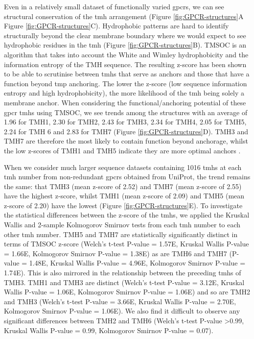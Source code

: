 Even in a relatively small dataset of functionally varied \gls{gpcr}s, we can see structural conservation of the \gls{tmh} arrangement (Figure \ref{fig:GPCR-structures}A Figure \ref{fig:GPCR-structures}C).
Hydrophobic patterns are hard to identify structurally beyond the clear membrane boundary where we would expect to see hydrophobic residues in the \gls{tmh} (Figure \ref{fig:GPCR-structures}B).
TMSOC \cite{Wong2011, Wong2012} is an algorithm that takes into account the White and Wimley hydrophobicity \cite{White1999} and the information entropy of the TMH sequence.
The resulting z\--score has been shown to be able to scrutinise between \gls{tmh}s that serve as anchors and those that have a function beyond \gls{tmp} anchoring.
The lower the z\--score (low sequence information entropy and high hydrophobicity), the more likelihood of the \gls{tmh} being solely a membrane anchor.
When considering the functional/anchoring potential of these \gls{gpcr} \gls{tmh}s  using TMSOC, we see trends among the structures with an average of 1.96 for TMH1, 2.30 for TMH2, 2.43 for TMH3, 2.34 for TMH4, 2.05 for TMH5, 2.24 for TMH 6 and 2.83 for TMH7 (Figure \ref{fig:GPCR-structures}D).
TMH3 and TMH7 are therefore the most likely to contain function beyond anchorage, whilst the low z\--scores of TMH1 and TMH5 indicate they are more optimal anchors \cite{Baker2017}.

When we consider much larger sequence datasets containing 1016 \gls{tmh}s at each \gls{tmh} number from non-redundant \gls{gpcr}s obtained from UniProt, the trend remains the same: that TMH3 (mean z\--score of 2.52) and TMH7 (mean z\--score of 2.55) have the highest z\--score, whilst TMH1 (mean z\--score of 2.09) and TMH5 (mean z\--score of 2.20) have the lowest (Figure \ref{fig:GPCR-structures}E).
To investigate the statistical differences between the z\--score of the \gls{tmh}s, we applied the Kruskal Wallis and 2-sample Kolmogorov Smirnov tests from each \gls{tmh} number to each other \gls{tmh} number.
TMH5 and TMH7 are statistically significantly distinct in terms of TMSOC z\--score (Welch's t-test P\--value = 1.57E, Kruskal Wallis P\--value = 1.66E, Kolmogorov Smirnov P\--value = 1.38E) as are TMH6 and TMH7 (P\--value = 1.48E, Kruskal Wallis P\--value = 4.96E, Kolmogorov Smirnov P\--value = 1.74E).
This is also mirrored in the relationship between the preceding \gls{tmh}s of TMH3.
TMH1 and TMH3 are distinct (Welch's t-test P\--value = 3.12E, Kruskal Wallis P\--value = 1.06E, Kolmogorov Smirnov P\--value = 1.06E) and so are TMH2 and TMH3 (Welch's t-test P\--value = 3.66E, Kruskal Wallis P\--value = 2.70E, Kolmogorov Smirnov P\--value = 1.06E).
We also find it difficult to observe any significant differences between TMH2 and TMH6 (Welch's t\--test P\--value \textgreater 0.99, Kruskal Wallis P\--value = 0.99, Kolmogorov Smirnov P\--value = 0.07).


